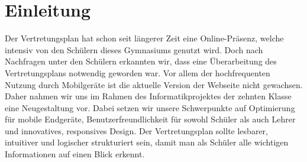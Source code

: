 \chapter{Einleitung}
Der Vertretungsplan hat schon seit längerer Zeit eine Online-Präsenz, welche
intensiv von den Schülern dieses Gymnasiums genutzt wird. Doch nach Nachfragen unter den Schülern
erkannten wir, dass eine Überarbeitung des Vertretungsplans notwendig geworden war. Vor allem der
hochfrequenten Nutzung durch Mobilgeräte ist die aktuelle Version der Webseite nicht gewachsen.
Daher nahmen  wir uns im Rahmen des Informatikprojektes der zehnten Klasse eine Neugestaltung vor.
Dabei setzen wir unsere Schwerpunkte auf Optimierung für mobile Endgeräte, Benutzerfreundlichkeit
für sowohl Schüler als auch Lehrer und innovatives, responsives Design. Der Vertretungsplan sollte
lesbarer, intuitiver und logischer strukturiert sein, damit man als Schüler alle wichtigen Informationen
auf einen Blick erkennt.
